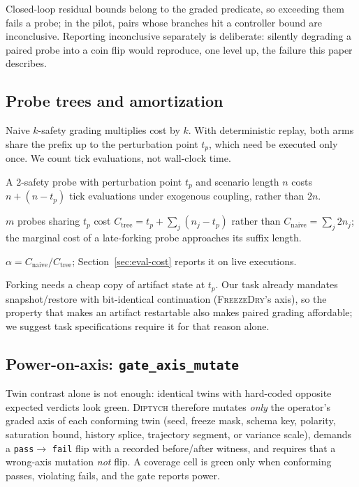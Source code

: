 \documentclass[sigconf,review,anonymous]{acmart}
\newcommand{\sys}{\textsc{Diptych}}
\begin{document}
	Closed-loop residual bounds belong to the graded predicate, so exceeding
	them fails a probe; in the pilot, pairs whose branches hit a controller
	bound are inconclusive. Reporting inconclusive separately is deliberate:
	silently degrading a paired probe into a coin flip would reproduce, one
	level up, the failure this paper describes.
	
	\subsection{Probe trees and amortization}
	
	Naive $k$-safety grading multiplies cost by $k$. With deterministic replay,
	both arms share the prefix up to the perturbation point $t_p$, which need
	be executed only once. We count tick evaluations, not wall-clock time.
	
	\begin{proposition}
		\label{prop:prefix}
		A $2$-safety probe with perturbation point $t_p$ and scenario length $n$
		costs $n + (n - t_p)$ tick evaluations under exogenous coupling, rather
		than $2n$.
	\end{proposition}
	
	\begin{corollary}
		\label{cor:tree}
		$m$ probes sharing $t_p$ cost $C_{\mathrm{tree}} = t_p + \sum_{j}(n_j -
		t_p)$ rather than $C_{\mathrm{naive}} = \sum_j 2 n_j$; the marginal cost
		of a late-forking probe approaches its suffix length.
	\end{corollary}
	
	\begin{definition}
		\label{def:cost}
		$\alpha = C_{\mathrm{naive}} / C_{\mathrm{tree}}$;
		Section~\ref{sec:eval-cost} reports it on live executions.
	\end{definition}
	
	Forking needs a cheap copy of artifact state at $t_p$. Our task already
	mandates snapshot/restore with bit-identical continuation
	(\textsc{FreezeDry}'s axis), so the property that makes an artifact
	restartable also makes paired grading affordable; we suggest task
	specifications require it for that reason alone.
	
	\subsection{Power-on-axis: \texttt{gate\_axis\_mutate}}
	
	Twin contrast alone is not enough: identical twins with hard-coded
	opposite expected verdicts look green. \sys{} therefore mutates
	\emph{only} the operator's graded axis of each conforming twin (seed,
	freeze mask, schema key, polarity, saturation bound, history splice,
	trajectory segment, or variance scale), demands a \texttt{pass}$\to$%
	\texttt{fail} flip with a recorded before/after witness, and requires
	that a wrong-axis mutation \emph{not} flip. A coverage cell is green only
	when conforming passes, violating fails, and the gate reports power.
	
\end{document}
